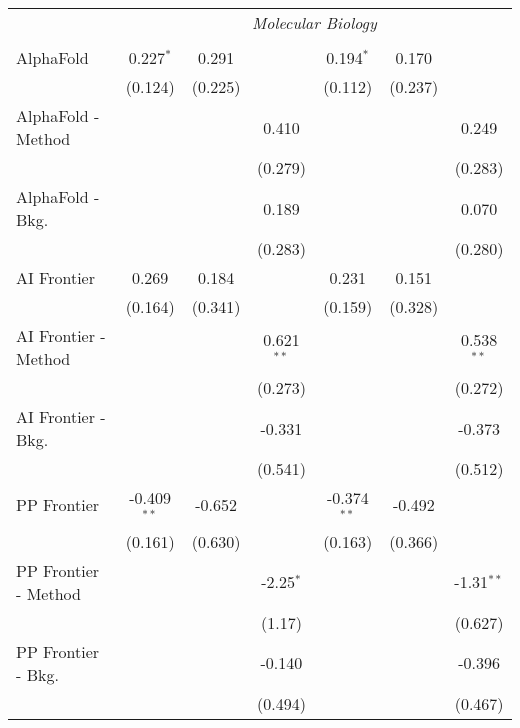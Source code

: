\begin{tabular}{lcccccc}
 & \multicolumn{6}{c}{\textit{Molecular Biology}} \\ \\
   AlphaFold            & 0.227$^{*}$   & 0.291   &              & 0.194$^{*}$   & 0.170   &   \\   
                        & (0.124)       & (0.225) &              & (0.112)       & (0.237) &   \\   
   AlphaFold - Method   &               &         & 0.410        &               &         & 0.249\\   
                        &               &         & (0.279)      &               &         & (0.283)\\   
   AlphaFold - Bkg.     &               &         & 0.189        &               &         & 0.070\\   
                        &               &         & (0.283)      &               &         & (0.280)\\   
   AI Frontier          & 0.269         & 0.184   &              & 0.231         & 0.151   &   \\   
                        & (0.164)       & (0.341) &              & (0.159)       & (0.328) &   \\   
   AI Frontier - Method &               &         & 0.621$^{**}$ &               &         & 0.538$^{**}$\\   
                        &               &         & (0.273)      &               &         & (0.272)\\   
   AI Frontier - Bkg.   &               &         & -0.331       &               &         & -0.373\\   
                        &               &         & (0.541)      &               &         & (0.512)\\   
   PP Frontier          & -0.409$^{**}$ & -0.652  &              & -0.374$^{**}$ & -0.492  &   \\   
                        & (0.161)       & (0.630) &              & (0.163)       & (0.366) &   \\   
   PP Frontier - Method &               &         & -2.25$^{*}$  &               &         & -1.31$^{**}$\\   
                        &               &         & (1.17)       &               &         & (0.627)\\   
   PP Frontier - Bkg.   &               &         & -0.140       &               &         & -0.396\\   
                        &               &         & (0.494)      &               &         & (0.467)\\   

\end{tabular}

